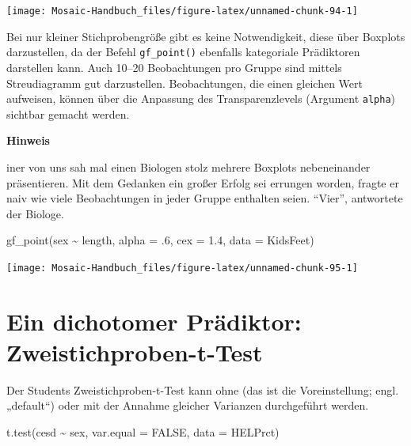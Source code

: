 \documentclass[
  ngerman,
]{scrbook}
\newenvironment{Shaded}{\begin{snugshade}}{\end{snugshade}}
\newcommand{\AttributeTok}[1]{\textcolor[rgb]{0.77,0.63,0.00}{#1}}
\newcommand{\ConstantTok}[1]{\textcolor[rgb]{0.00,0.00,0.00}{#1}}
\newcommand{\DecValTok}[1]{\textcolor[rgb]{0.00,0.00,0.81}{#1}}
\newcommand{\FloatTok}[1]{\textcolor[rgb]{0.00,0.00,0.81}{#1}}
\newcommand{\FunctionTok}[1]{\textcolor[rgb]{0.00,0.00,0.00}{#1}}
\newcommand{\NormalTok}[1]{#1}
\newcommand{\SpecialCharTok}[1]{\textcolor[rgb]{0.00,0.00,0.00}{#1}}
\newenvironment{hinweis}[1]
  {
  \begin{itemize}
  \renewcommand{\labelitemi}{
    \raisebox{1.8\height}[0pt][0pt]{
      {\setkeys{Gin}{width=7em,keepaspectratio}
        {\Large \textcolor{dark-fom-green}\faHandORight}}
        }
  }
  \begin{blackbox}
        \bgroup\color{dark-fom-green}
          {\textbf{Hinweis}}
        \egroup
  \item
  }
  {
  \end{blackbox}
  \end{itemize}
  }
\begin{document}
\begin{center}\texttt{[image: Mosaic-Handbuch\_files/figure-latex/unnamed-chunk-94-1]} \end{center}

Bei nur kleiner Stichprobengröße gibt es keine Notwendigkeit, diese über Boxplots darzustellen, da der Befehl \texttt{gf\_point()} ebenfalls kategoriale Prädiktoren darstellen kann. Auch 10--20 Beobachtungen pro Gruppe sind mittels Streudiagramm gut darzustellen. Beobachtungen, die einen gleichen Wert aufweisen, können über die Anpassung des Transparenzlevels (Argument \texttt{alpha}) sichtbar gemacht werden.

\begin{hinweis}
Einer von uns sah mal einen Biologen stolz mehrere Boxplots nebeneinander präsentieren. Mit dem Gedanken ein großer Erfolg sei errungen worden, fragte er naiv wie viele Beobachtungen in jeder Gruppe enthalten seien. ``Vier'', antwortete der Biologe.

\end{hinweis}

\begin{Shaded}
\begin{Highlighting}[]
\FunctionTok{gf\_point}\NormalTok{(sex }\SpecialCharTok{\textasciitilde{}}\NormalTok{ length, }\AttributeTok{alpha =}\NormalTok{ .}\DecValTok{6}\NormalTok{, }\AttributeTok{cex =} \FloatTok{1.4}\NormalTok{, }
         \AttributeTok{data =}\NormalTok{ KidsFeet)}
\end{Highlighting}
\end{Shaded}

\begin{center}\texttt{[image: Mosaic-Handbuch\_files/figure-latex/unnamed-chunk-95-1]} \end{center}

\hypertarget{ein-dichotomer-pruxe4diktor-zweistichproben-t-test}{%
\section{Ein dichotomer Prädiktor: Zweistichproben-t-Test}\label{ein-dichotomer-pruxe4diktor-zweistichproben-t-test}}

Der Students Zweistichproben-t-Test kann ohne (das ist die Voreinstellung; engl. „default``) oder mit der Annahme gleicher Varianzen durchgeführt werden.

\begin{Shaded}
\begin{Highlighting}[]
\FunctionTok{t.test}\NormalTok{(cesd }\SpecialCharTok{\textasciitilde{}}\NormalTok{ sex, }\AttributeTok{var.equal =} \ConstantTok{FALSE}\NormalTok{, }\AttributeTok{data =}\NormalTok{ HELPrct)}
\end{Highlighting}
\end{Shaded}
\end{document}
